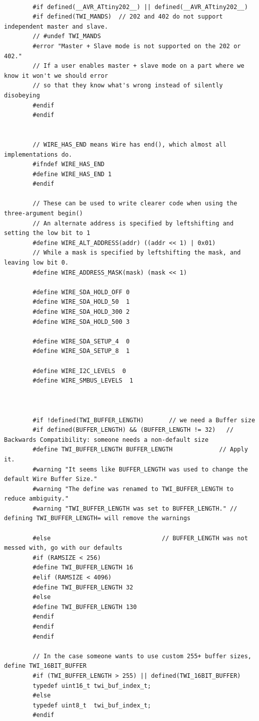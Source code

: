 \documentclass[11pt,a4paper,titlepage]{report}
\begin{document}
\begin{lstlisting}
		
		#if defined(__AVR_ATtiny202__) || defined(__AVR_ATtiny202__)
		#if defined(TWI_MANDS)  // 202 and 402 do not support independent master and slave.
		// #undef TWI_MANDS
		#error "Master + Slave mode is not supported on the 202 or 402."
		// If a user enables master + slave mode on a part where we know it won't we should error
		// so that they know what's wrong instead of silently disobeying
		#endif
		#endif
		
		
		// WIRE_HAS_END means Wire has end(), which almost all implementations do.
		#ifndef WIRE_HAS_END
		#define WIRE_HAS_END 1
		#endif
		
		// These can be used to write clearer code when using the three-argument begin()
		// An alternate address is specified by leftshifting and setting the low bit to 1
		#define WIRE_ALT_ADDRESS(addr) ((addr << 1) | 0x01)
		// While a mask is specified by leftshifting the mask, and leaving low bit 0.
		#define WIRE_ADDRESS_MASK(mask) (mask << 1)
		
		#define WIRE_SDA_HOLD_OFF 0
		#define WIRE_SDA_HOLD_50  1
		#define WIRE_SDA_HOLD_300 2
		#define WIRE_SDA_HOLD_500 3
		
		#define WIRE_SDA_SETUP_4  0
		#define WIRE_SDA_SETUP_8  1
		
		#define WIRE_I2C_LEVELS  0
		#define WIRE_SMBUS_LEVELS  1
		
		
		
		#if !defined(TWI_BUFFER_LENGTH)       // we need a Buffer size
		#if defined(BUFFER_LENGTH) && (BUFFER_LENGTH != 32)   // Backwards Compatibility: someone needs a non-default size
		#define TWI_BUFFER_LENGTH BUFFER_LENGTH             // Apply it.
		#warning "It seems like BUFFER_LENGTH was used to change the default Wire Buffer Size."
		#warning "The define was renamed to TWI_BUFFER_LENGTH to reduce ambiguity."
		#warning "TWI_BUFFER_LENGTH was set to BUFFER_LENGTH." // defining TWI_BUFFER_LENGTH= will remove the warnings
		
		#else                               // BUFFER_LENGTH was not messed with, go with our defaults
		#if (RAMSIZE < 256)
		#define TWI_BUFFER_LENGTH 16
		#elif (RAMSIZE < 4096)
		#define TWI_BUFFER_LENGTH 32
		#else
		#define TWI_BUFFER_LENGTH 130
		#endif
		#endif
		#endif
		
		// In the case someone wants to use custom 255+ buffer sizes, define TWI_16BIT_BUFFER
		#if (TWI_BUFFER_LENGTH > 255) || defined(TWI_16BIT_BUFFER)
		typedef uint16_t twi_buf_index_t;
		#else
		typedef uint8_t  twi_buf_index_t;
		#endif
		

\end{lstlisting}
\end{document}
